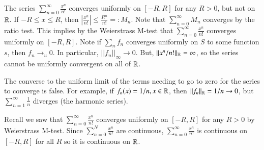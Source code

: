 \begin{eg}
    The series $\sum_{n=0}^{\infty}\frac{x^n}{n!}$ converges uniformly on $[-R,R]$ for any $R > 0$, but not on $\mathbb R$. If $-R \leq x \leq R$, then $\left|\frac{x^n}{n!}\right| \leq \frac{R^n}{n!} =: M_n$. Note that $\sum_{n=0}^{\infty}M_n$ converges by the ratio test. This implies by the Weierstrass M-test that $\sum_{n=0}^{\infty}\frac{x^n}{n!}$ converges uniformly on $[-R,R]$. Note if $\sum_nf_n$ converges uniformly on $S$ to some function $s$, then $f_n\rightarrow_u 0$. In particular, $||f_n||_{\infty}\rightarrow 0$. But, $||x^n/n!||_{\mathbb R} = \infty$, so the series cannot be uniformly convergent on all of $\mathbb R$.
\end{eg}

The converse to the uniform limit of the terms needing to go to zero for the series to converge is false. For example, if $f_n(x) = 1/n, x \in \mathbb R$, then $||f_n||_{\mathbb R} = 1/n\rightarrow 0$, but $\sum_{n=1}^{\infty}\frac{1}{n}$ diverges (the harmonic series).

\begin{eg}
    Recall we saw that $\sum_{n=0}^{\infty}\frac{x^n}{n!}$ converges uniformly on $[-R,R]$ for any $R > 0$ by Weierstrass M-test. Since $\sum_{n=0}^N\frac{x^n}{n!}$ are continuous, $\sum_{n=0}^{\infty}\frac{x^n}{n!}$ is continuous on $[-R,R]$ for all $R$ so it is continuous on $\mathbb R$.
\end{eg}



